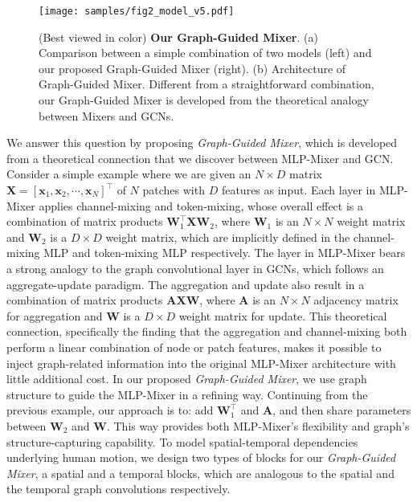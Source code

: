 \documentclass[10pt,twocolumn,letterpaper]{article}
\begin{document}
            \begin{figure*}[!ht]
            \centering
            \texttt{[image: samples/fig2\_model\_v5.pdf]} \caption{(Best viewed in color)
            \textbf{Our Graph-Guided Mixer}. (a) Comparison between a simple combination of two models (left) and our proposed Graph-Guided Mixer (right). (b) Architecture of Graph-Guided Mixer.
            Different from a straightforward combination, our Graph-Guided Mixer is developed from the theoretical analogy between Mixers and GCNs.
            }
            \label{network}
\end{figure*}

            
    We answer this question by proposing \textit{Graph-Guided Mixer}, which is developed from a theoretical connection that we discover between MLP-Mixer and GCN.
    Consider a simple example where we are given an $N\times D$ matrix $\mathbf{X} = [\mathbf{x}_1,\mathbf{x}_2,\cdots,\mathbf{x}_N]^\top$ of $N$ patches with $D$ features as input.
    Each layer in MLP-Mixer applies channel-mixing and token-mixing, whose overall effect is a combination of matrix products $\mathbf{W}_1^\top\mathbf{X}\mathbf{W}_2$, where $\mathbf{W}_1$ is an $N\times N$ weight matrix and $\mathbf{W}_2$ is a $D\times D$ weight matrix, which are implicitly defined in the channel-mixing MLP and token-mixing MLP respectively.
The layer in MLP-Mixer bears a strong analogy to the graph convolutional layer in GCNs, which follows an aggregate-update paradigm.
    The aggregation and update also result in a combination of matrix products $\mathbf{A}\mathbf{X}\mathbf{W}$, where $\mathbf{A}$ is an $N\times N$ adjacency matrix for aggregation and $\mathbf{W}$ is a $D\times D$ weight matrix for update.
This theoretical connection, specifically the finding that the aggregation and channel-mixing both perform a linear combination of node or patch features, makes it possible to inject graph-related information into the original MLP-Mixer architecture with little additional cost. In our proposed \textit{Graph-Guided Mixer}, we use graph structure to guide the MLP-Mixer in a refining way. Continuing from the previous example, our approach is to: add $\mathbf{W}_1^\top$ and $\mathbf{A}$, and then share parameters between $\mathbf{W}_2$ and $\mathbf{W}$.
    This way provides both MLP-Mixer's flexibility and graph's structure-capturing capability.
    To model spatial-temporal dependencies underlying human motion, we design two types of blocks for our \textit{Graph-Guided Mixer}, a spatial and a temporal blocks, which are analogous to the spatial and the temporal graph convolutions respectively.
    
\end{document}
